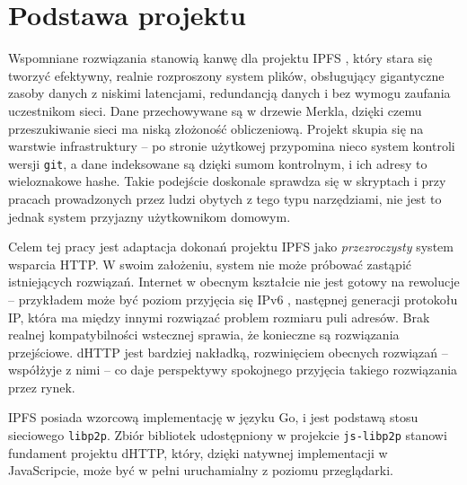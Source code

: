 \section{Podstawa projektu}
\label{sec:podstawaProjektu}

Wspomniane rozwiązania stanowią kanwę dla projektu IPFS \cite{ipfsWP}, który stara się tworzyć efektywny, realnie rozproszony system plików, obsługujący gigantyczne zasoby danych z niskimi latencjami, redundancją danych i bez wymogu zaufania uczestnikom sieci.  Dane przechowywane są w drzewie Merkla, dzięki czemu przeszukiwanie sieci ma niską złożoność obliczeniową. Projekt skupia się na warstwie infrastruktury – po stronie użytkowej przypomina nieco system kontroli wersji \texttt{git}, a dane indeksowane są dzięki sumom kontrolnym, i ich adresy to wieloznakowe hashe. Takie podejście doskonale sprawdza się w skryptach i przy pracach prowadzonych przez ludzi obytych z tego typu narzędziami, nie jest to jednak system przyjazny użytkownikom domowym.

Celem tej pracy jest adaptacja dokonań projektu IPFS jako {\em przezroczysty} system wsparcia HTTP. W swoim założeniu, system nie może próbować zastąpić istniejących rozwiązań. Internet w obecnym kształcie nie jest gotowy na rewolucje – przykładem może być poziom przyjęcia się IPv6 \cite{googleipv6}, następnej generacji protokołu IP, która ma między innymi rozwiązać problem rozmiaru puli adresów. Brak realnej kompatybilności wstecznej sprawia, że konieczne są rozwiązania przejściowe. dHTTP jest bardziej nakładką, rozwinięciem obecnych rozwiązań -- współżyje z nimi -- co daje perspektywy spokojnego przyjęcia takiego rozwiązania przez rynek.

IPFS posiada wzorcową implementację w języku Go, i jest podstawą stosu sieciowego \texttt{libp2p}. Zbiór bibliotek udostępniony w projekcie \texttt{js-libp2p} stanowi fundament projektu dHTTP, który, dzięki natywnej implementacji w JavaScripcie, może być w pełni uruchamialny z poziomu przeglądarki.
